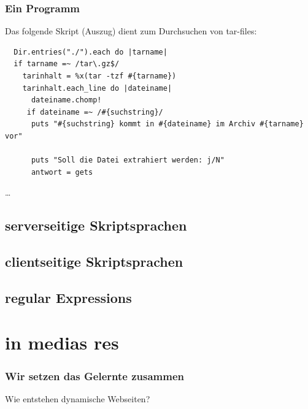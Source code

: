 \begin{frame}[fragile]
  \frametitle{Ein Programm}
  Das folgende Skript (Auszug) dient zum Durchsuchen von tar-files:
  
  \begin{lstlisting}
  Dir.entries("./").each do |tarname|
  if tarname =~ /tar\.gz$/
    tarinhalt = %x(tar -tzf #{tarname}) 
    tarinhalt.each_line do |dateiname|
      dateiname.chomp!
     if dateiname =~ /#{suchstring}/
      puts "#{suchstring} kommt in #{dateiname} im Archiv #{tarname} vor"

      puts "Soll die Datei extrahiert werden: j/N"
      antwort = gets
  \end{lstlisting}

  \ldots
\end{frame}

  \subsection{serverseitige Skriptsprachen}
  \subsection{clientseitige Skriptsprachen}
  \subsection{regular Expressions}



\section{in medias res}
\begin{frame}
\frametitle{Wir setzen das Gelernte zusammen}
  Wie entstehen dynamische Webseiten? 
\end{frame}
